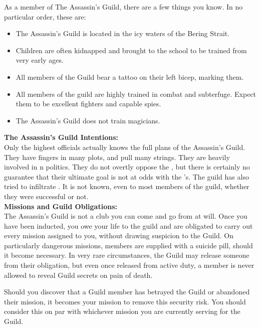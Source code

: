 \documentclass[blue]{NeptuneBall}
\begin{document}
\name{\bAssassin{}}

As a member of The Assassin's Guild, there are a few things you know. In no particular order, these are:

\begin{itemize}
  \item The Assassin's Guild is located in the icy waters of the Bering Strait.
  \item Children are often kidnapped and brought to the school to be trained from very early ages.
  \item All members of the Guild bear a tattoo on their left bicep, marking them.
  \item All members of the guild are highly trained in combat and subterfuge. Expect them to be excellent fighters and capable spies.
  \item The Assassin's Guild does not train magicians.\\
\end{itemize}

{\bf The Assassin's Guild Intentions:}\\
Only the highest officials actually knows the full plans of the Assassin's Guild. They have fingers in many plots, and pull many strings. They are heavily involved in \pPacifica{}n politics.  They do not overtly oppose the \cPacificanRuler{\King}, but there is certainly no guarantee that their ultimate goal is not at odds with the \cPacificanRuler{\King}'s. The guild has also tried to infiltrate \pAtlantis{}. It is not known, even to most members of the guild, whether they were successful or not.\\

{\bf Missions and Guild Obligations:}\\
The Assassin's Guild is not a club you can come and go from at will. Once you have been inducted, you owe your life to the guild and are obligated to carry out every mission assigned to you, without drawing suspicion to the Guild. On particularly dangerous missions, members are supplied with a suicide pill, should it become necessary. In very rare circumstances, the Guild may release someone from their obligation, but even once released from active duty, a member is never allowed to reveal Guild secrets on pain of death.

Should you discover that a Guild member has betrayed the Guild or abandoned their mission, it becomes your mission to remove this security risk. You should consider this on par with whichever mission you are currently serving for the Guild.
\end{document}
